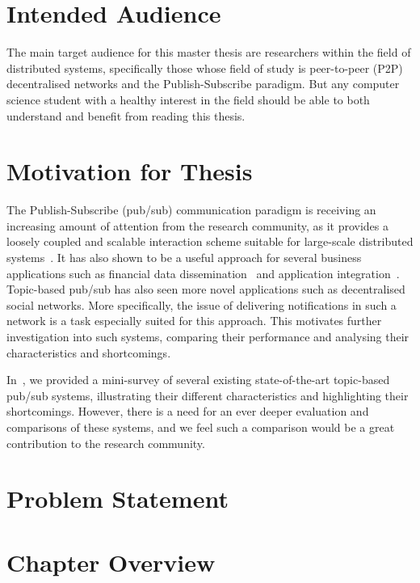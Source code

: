 \section{Intended Audience}

The main target audience for this master thesis are researchers within
the field of distributed systems, specifically those whose field of
study is peer-to-peer (P2P) decentralised networks and the
Publish-Subscribe paradigm. But any computer science student with a
healthy interest in the field should be able to both understand and
benefit from reading this thesis.


\section{Motivation for Thesis}

The Publish-Subscribe (pub/sub) communication paradigm is receiving an
increasing amount of attention from the research community, as it
provides a loosely coupled and scalable interaction scheme suitable for
large-scale distributed systems~\cite{Eugster:2003}. It has also shown
to be a useful approach for several business applications such as
financial data dissemination~\cite{tibcorv} and application
integration~\cite{goops}.  Topic-based pub/sub has also seen more novel
applications such as decentralised social networks. More specifically,
the issue of delivering notifications in such a network is a task
especially suited for this approach. This motivates further
investigation into such systems, comparing their performance and
analysing their characteristics and shortcomings.

In~\cite{Setty:2012}, we provided a mini-survey of several existing
state-of-the-art topic-based pub/sub systems, illustrating their
different characteristics and highlighting their shortcomings. However,
there is a need for an ever deeper evaluation and comparisons of these
systems, and we feel such a comparison would be a great contribution to
the research community.

\section{Problem Statement}

\section{Chapter Overview}

